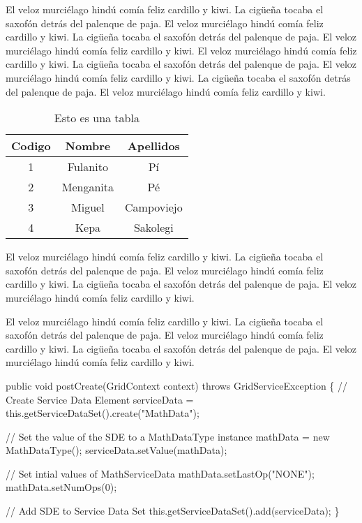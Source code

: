 El veloz murciélago hindú comía feliz cardillo y kiwi.  La cigüeña tocaba el saxofón detrás del palenque de paja.  El veloz murciélago hindú comía feliz cardillo y kiwi.  La cigüeña tocaba el saxofón detrás del palenque de paja.  El veloz murciélago hindú comía feliz cardillo y kiwi. El veloz murciélago hindú comía feliz cardillo y kiwi.  La cigüeña tocaba el saxofón detrás del palenque de paja.  El veloz murciélago hindú comía feliz cardillo y kiwi.  La cigüeña tocaba el saxofón detrás del palenque de paja.  El veloz murciélago hindú comía feliz cardillo y kiwi.

\begin{table}
\begin{center}
\begin{tabular}{|c|c|c|}
\hline Codigo & Nombre & Apellidos \\ 
\hline\hline 1 & Fulanito & Pí \\ 
\hline 2 & Menganita & Pé \\ 
\hline 3 & Miguel & Campoviejo \\ 
\hline 4 & Kepa & Sakolegi \\ 
\hline 
\end{tabular} 
\caption{Esto es una tabla}
\label{tbTabla3}
\end{center}
\end{table}

El veloz murciélago hindú comía feliz cardillo y kiwi.  La cigüeña tocaba el saxofón detrás del palenque de paja.  El veloz murciélago hindú comía feliz cardillo y kiwi.  La cigüeña tocaba el saxofón detrás del palenque de paja.  El veloz murciélago hindú comía feliz cardillo y kiwi.


El veloz murciélago hindú comía feliz cardillo y kiwi.  La cigüeña tocaba el saxofón detrás del palenque de paja.  El veloz murciélago hindú comía feliz cardillo y kiwi.  La cigüeña tocaba el saxofón detrás del palenque de paja.  El veloz murciélago hindú comía feliz cardillo y kiwi.

\begin{codigo}
public void postCreate(GridContext context) throws GridServiceException
\{
    // Create Service Data Element
    serviceData = this.getServiceDataSet().create("MathData");

    // Set the value of the SDE to a MathDataType instance
    mathData = new MathDataType();
    serviceData.setValue(mathData);

    // Set intial values of MathServiceData
    mathData.setLastOp("NONE");
    mathData.setNumOps(0);

    // Add SDE to Service Data Set
    this.getServiceDataSet().add(serviceData);
\}
\end{codigo}

